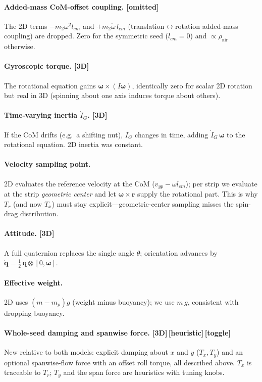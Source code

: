 \documentclass[11pt]{article}
\newcommand{\newin}{{\small\textbf{\color{blue}[3D]}}}          %
\newcommand{\drop}{{\small\textbf{\color{red!70!black}[omitted]}}} %
\newcommand{\heur}{{\small\textbf{\color{teal}[heuristic]}}}     %
\newcommand{\opt}{{\small\textbf{\color{orange!80!black}[toggle]}}} %
\begin{document}
\paragraph{Added-mass CoM-offset coupling. \drop{}} The 2D terms $-m_2\omega^2 l_{cm}$ and
$+m_2\dot\omega\, l_{cm}$ (translation$\leftrightarrow$rotation added-mass coupling) are
dropped. Zero for the symmetric seed ($l_{cm}=0$) and $\propto\rho_{\text{air}}$ otherwise.

\paragraph{Gyroscopic torque. \newin{}} The rotational equation gains
$\boldsymbol\omega\times(I\boldsymbol\omega)$, identically zero for scalar 2D rotation but
real in 3D (spinning about one axis induces torque about others).

\paragraph{Time-varying inertia $\dot I_G$. \newin{}} If the CoM drifts (e.g.\ a shifting
nut), $I_G$ changes in time, adding $\dot I_G\,\boldsymbol\omega$ to the rotational equation.
2D inertia was constant.

\paragraph{Velocity sampling point.} 2D evaluates the reference velocity at the CoM
($v_{yp}-\omega l_{cm}$); per strip we evaluate at the strip \emph{geometric center} and let
$\boldsymbol\omega\times\mathbf r$ supply the rotational part. This is why $T_r$ (and now
$T_x$) must stay explicit---geometric-center sampling misses the spin-drag distribution.

\paragraph{Attitude. \newin{}} A full quaternion replaces the single angle $\theta$;
orientation advances by $\dot{\mathbf q}=\tfrac12\,\mathbf q\otimes[0,\boldsymbol\omega]$.

\paragraph{Effective weight.} 2D uses $(m-m_p)g$ (weight minus buoyancy); we use $m\,g$,
consistent with dropping buoyancy.

\paragraph{Whole-seed damping and spanwise force. \newin{}\,\heur{}\,\opt{}} New relative to
both models: explicit damping about $x$ and $y$ ($T_x,T_y$) and an optional spanwise-flow
force with an offset roll torque, all described above. $T_x$ is traceable to $T_r$; $T_y$
and the span force are heuristics with tuning knobs.
\end{document}
